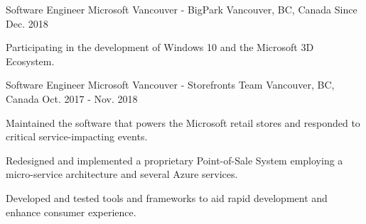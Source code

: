 

\begin{cventries}

  \cventry
    {Software Engineer} %
    {Microsoft Vancouver - BigPark} %
    {Vancouver, BC, Canada} %
    {Since Dec. 2018} %
    {
      \begin{cvitems} %
	      \item {Participating in the development of Windows 10 and the Microsoft 3D Ecosystem.}
        \\
      \end{cvitems}
    }

  \cventry
    {Software Engineer} %
    {Microsoft Vancouver - Storefronts Team} %
    {Vancouver, BC, Canada} %
    {Oct. 2017 - Nov. 2018} %
    {
      \begin{cvitems} %
	      \item {Maintained the software that powers the Microsoft retail stores and responded to critical service-impacting events.}
	      \item {Redesigned and implemented a proprietary Point-of-Sale System employing a micro-service architecture and several Azure services.}
        \item {Developed and tested tools and frameworks to aid rapid development and enhance consumer experience.}
        \\
      \end{cvitems}
    }


\end{cventries}
